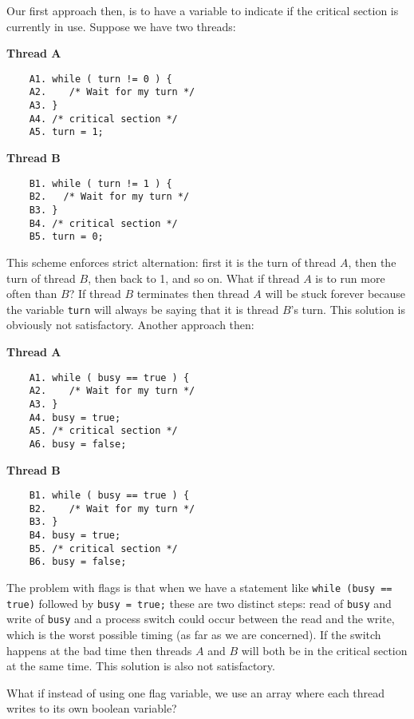 Our first approach then, is to have a variable to indicate if the critical section is currently in use. Suppose we have two threads:

\begin{multicols}{2}
\textbf{Thread A}
	\begin{verbatim}
	A1. while ( turn != 0 ) {
	A2.    /* Wait for my turn */
	A3. }
	A4. /* critical section */
	A5. turn = 1;
	\end{verbatim}
\columnbreak
\textbf{Thread B}
	\begin{verbatim}
	B1. while ( turn != 1 ) {
	B2.   /* Wait for my turn */
	B3. }
	B4. /* critical section */
	B5. turn = 0;
	\end{verbatim}
\end{multicols}

This scheme enforces strict alternation: first it is the turn of thread $A$, then the turn of thread $B$, then back to 1, and so on. What if thread $A$ is to run more often than $B$? If thread $B$ terminates then thread $A$ will be stuck forever because the variable \texttt{turn} will always be saying that it is thread $B$'s turn. This solution is obviously not satisfactory. Another approach then:

\begin{multicols}{2}
\textbf{Thread A}
	\begin{verbatim}
	A1. while ( busy == true ) {
	A2.    /* Wait for my turn */
	A3. }
	A4. busy = true;
	A5. /* critical section */
	A6. busy = false;
	\end{verbatim}
\columnbreak
\textbf{Thread B}
	\begin{verbatim}
	B1. while ( busy == true ) {
	B2.    /* Wait for my turn */
	B3. }
	B4. busy = true;
	B5. /* critical section */
	B6. busy = false;
	\end{verbatim}
\end{multicols}


The problem with flags is that when we have a statement like \texttt{while (busy == true)} followed by \texttt{busy = true;} these are two distinct steps: read of \texttt{busy} and write of \texttt{busy} and a process switch could occur between the read and the write, which is the worst possible timing (as far as we are concerned). If the switch happens at the bad time then threads $A$ and $B$ will both be in the critical section at the same time. This solution is also not satisfactory.

What if instead of using one flag variable, we use an array where each thread writes to its own boolean variable?

